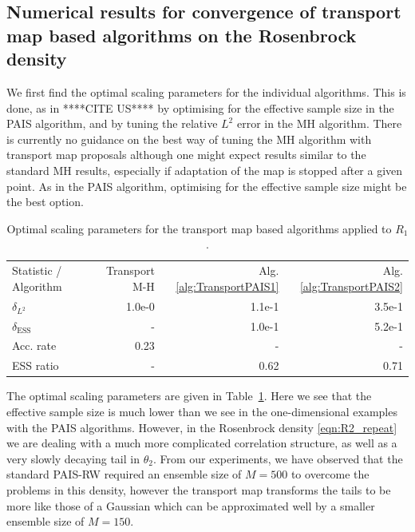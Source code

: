 \documentclass[final]{siamltex}
\begin{document}
\subsection[Numerical results]{Numerical results for convergence of
  transport map based algorithms on the Rosenbrock density}

We first find the optimal scaling parameters for the individual
algorithms. This is done, as in ****CITE US**** by optimising for the effective sample size in
the PAIS algorithm, and by tuning the relative $L^2$ error in the MH
algorithm. There is currently no
guidance on the best way of tuning the MH algorithm with transport map
proposals although one might expect results similar to the standard MH
results, especially if adaptation of the map is stopped after a given
point. As in the PAIS algorithm, optimising for the effective sample size might be the best option.

\begin{table}[!ht]
\centering
\begin{tabular}{lrrr}
\toprule
	Statistic \quad / \quad Algorithm & Transport M-H &
                                                            Alg. \ref{alg:TransportPAIS1} & Alg. \ref{alg:TransportPAIS2}  \\ \cmidrule(lr){1-4}
	$\delta_{L^2}$				 & 1.0e-0 & 1.1e-1 & 3.5e-1 \\
	$\delta_{\text{ESS}}$				 & - & 1.0e-1 & 5.2e-1 \\ \cmidrule(lr){1-4}
	Acc. rate							 & 0.23 & - & - \\
	ESS ratio							 & - & 0.62 & 0.71 \\
\bottomrule
\end{tabular}
\caption{Optimal scaling parameters for the transport map based algorithms applied to $R_1$.}
\label{tab:R2_opt_scaling}
\end{table}

The optimal scaling parameters are given in
Table~\ref{tab:R2_opt_scaling}. Here we see that the effective sample
size is much lower than we see in the one-dimensional examples with
the PAIS algorithms. However, in the Rosenbrock density
\eqref{eqn:R2_repeat} we are dealing with a much more complicated
correlation structure, as well as a very slowly decaying tail in
$\theta_2$. From our experiments, we have observed that the standard PAIS-RW required an ensemble size of $M=500$ to overcome the problems in this density, however the transport map transforms the tails to be more like those of a Gaussian which can be approximated well by a smaller ensemble size of $M=150$.
\end{document}
